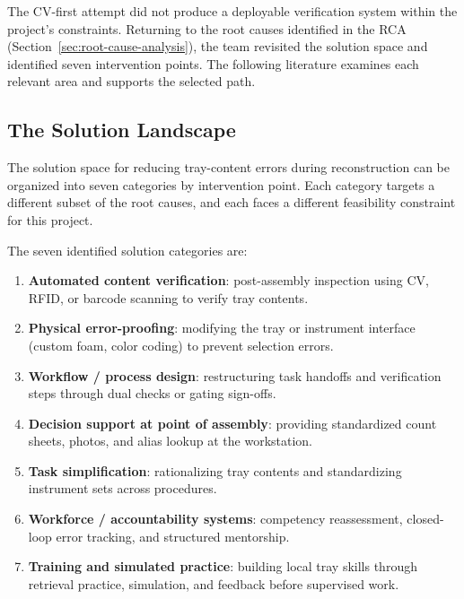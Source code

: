 \documentclass[10pt,a4paper]{article}
\begin{document}
The CV-first attempt did not produce a deployable verification system within the project's constraints. Returning to the root causes identified in the RCA (Section~\ref{sec:root-cause-analysis}), the team revisited the solution space and identified seven intervention points. The following literature examines each relevant area and supports the selected path.

\subsection{The Solution Landscape}
\label{sec:solution-landscape}

The solution space for reducing tray-content errors during reconstruction can
be organized into seven categories by intervention point. Each category targets
a different subset of the root causes, and each faces a
different feasibility constraint for this project.

The seven identified solution categories are:
\begin{enumerate}
  \item \textbf{Automated content verification}: post-assembly inspection using CV, RFID, or barcode scanning to verify tray contents.
  \item \textbf{Physical error-proofing}: modifying the tray or instrument interface (custom foam, color coding) to prevent selection errors.
  \item \textbf{Workflow / process design}: restructuring task handoffs and verification steps through dual checks or gating sign-offs.
  \item \textbf{Decision support at point of assembly}: providing standardized count sheets, photos, and alias lookup at the workstation.
  \item \textbf{Task simplification}: rationalizing tray contents and standardizing instrument sets across procedures.
  \item \textbf{Workforce / accountability systems}: competency reassessment, closed-loop error tracking, and structured mentorship.
  \item \textbf{Training and simulated practice}: building local tray skills through retrieval practice, simulation, and feedback before supervised work.
\end{enumerate}
\end{document}
